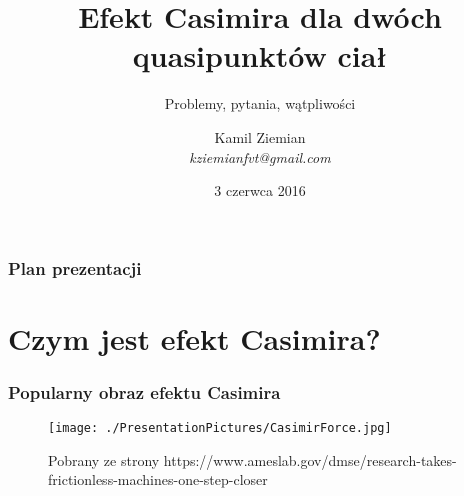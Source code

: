 \documentclass[10pt,t]{beamer}
\title{Efekt Casimira dla dwóch quasipunktów ciał}
\subtitle{Problemy, pytania, wątpliwości}
\author{Kamil Ziemian \\
  \textit{kziemianfvt@gmail.com}}
\date[3 VI 2016]{3 czerwca 2016}
\begin{document}






\RaggedRight





\maketitle %





\begin{frame}
  \frametitle{Plan prezentacji}


  \tableofcontents %

\end{frame}










\section{Czym jest efekt Casimira?}



\begin{frame}
  \frametitle{Popularny obraz efektu Casimira}


  \begin{figure}

    \centering

    \texttt{[image: ./PresentationPictures/CasimirForce.jpg]}


    \caption{Pobrany ze strony
      {https://www.ameslab.gov/dmse/research-takes-frictionless-machines-one-step-closer}}

  \end{figure}

\end{frame}
\end{document}

